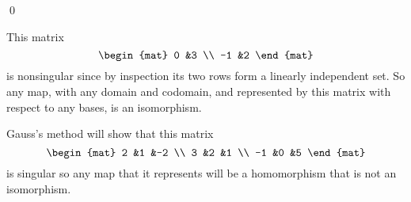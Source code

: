 \documentclass[10pt,t,serif,professionalfont]{beamer}
\begin{document}
\begin{frame}
\lm[le:NonsingMatIffNonsingMap]
\pause
\pf
{}

\pause
{}
\qed
\end{frame}




\begin{frame}
\ex
This matrix
\begin{equation*}
  \begin{mat}
    0  &3  \\
   -1  &2
  \end{mat}
\end{equation*}
is nonsingular since by inspection its two rows form a linearly independent
set.
So any map, with any domain and codomain, and represented by this matrix  
with respect to any bases,
is an isomorphism.

\pause
\ex
Gauss's method will show that this matrix
\begin{equation*}
  \begin{mat}
    2  &1  &-2  \\
    3  &2  &1   \\
   -1  &0  &5
  \end{mat}
\end{equation*}
is singular so any map that it represents will be a homomorphism that
is not an isomorphism.
\end{frame}




% 
\end{document}
